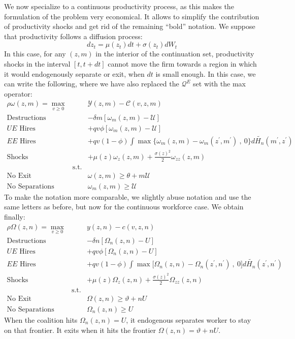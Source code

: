 We now specialize to a continuous productivity process, as this makes the
formulation of the problem very economical. It allows to simplify the
contribution of productivity shocks and get rid of the remaining ``bold''
notation. We suppose that productivity follows a diffusion process:
\begin{equation*}
dz_t = \mu(z_t) dt + \sigma(z_t) dW_t
\end{equation*}
In this case, for any $(z,m)$ in the interior of the continuation set,
productivity shocks in the interval $[t,t+dt]$ cannot move the firm
towards a region in which it would endogenously separate or exit, when $dt$
is small enough. In this case, we can write the following, where we have also replaced the $\mathcal{Q}^E$ set with the max operator:
\begin{eqnarray*}
\rho \omega \left( z,m\right) =\max_{v \geq 0} && \mathcal{Y} \left(
z,m\right) -\mathcal{C}\left( v,z,m\right) \\
\text{Destructions} &&-\delta m [\omega_m(z,m) - \mathcal{U}] \\
\text{$UE$ Hires} &&+qv \phi \left[ \omega_m(z,m) -\mathcal{U}\right] \\
\text{$EE$ Hires} &&+q v \left( 1-\phi \right) \int \max\Bigg\{\omega_m(z,m)
- \omega_m(z^{\prime},m^{\prime}) \ , \ 0 \Bigg\}d\widetilde{H_n}\left(
m^{\prime},z^{\prime }\right) \\
\text{Shocks} &&+\mu(z) \omega_z(z,m) + \frac{\sigma(z)^2}{2}
\omega_{zz}(z,m) \\
&\text{s.t.}& \\
\text{No Exit}&& \omega(z,m) \geq \theta + m \mathcal{U} \\
\text{No Separations}&& \omega_m(z,m) \geq \mathcal{U}
\end{eqnarray*}
To make the notation more comparable, we slightly abuse notation and use the
same letters as before, but now for the continuous workforce case. We obtain
finally:
\begin{eqnarray*}
\rho \Omega \left(z,n\right) =\max_{v \geq 0} && y\left(z,n\right) -c\left(
v,z,n\right) \\
\text{Destructions} &&-\delta n [\Omega_n(z,n) - U] \\
\text{$UE$ Hires} &&+q v \phi \left[ \Omega_n(z,n) -U \right] \\
\text{$EE$ Hires} &&+q v \left( 1-\phi \right) \int \max\Bigg[\Omega_n(z,n)
- \Omega_n(z^{\prime},n^{\prime}) \ , \ 0 \Bigg]d\widetilde{H_n}\left(
z^{\prime},n^{\prime}\right) \\
\text{Shocks} &&+\mu(z) \Omega_z(z,n) + \frac{\sigma(z)^2}{2}
\Omega_{zz}(z,n) \\
&\text{s.t.}& \\
\text{No Exit}&& \Omega(z,n) \geq \vartheta + n U \\
\text{No Separations}&& \Omega_n(z,n) \geq U
\end{eqnarray*}
When the coalition hits $\Omega_n(z,n) = U$, it endogenous separates worker
to stay on that frontier. It exits when it hits the frontier $\Omega(z,n) =
\vartheta + n U$.

